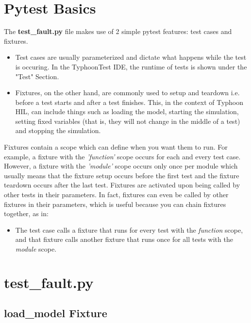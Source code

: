 \documentclass{article}
\begin{document}
\section{Pytest Basics}

The \textbf{test\_fault.py} file makes use of 2 simple pytest features: test cases and fixtures. 

\begin{itemize}

    \item Test cases are usually parameterized and dictate what happens while the test is occuring. In the TyphoonTest IDE, the runtime of tests is shown under the "Test" Section.
    
    \item  Fixtures, on the other hand, are commonly used to setup and teardown i.e. before a test starts and after a test finishes. This, in the context of Typhoon HIL, can include things such as loading the model, starting the simulation, setting fixed variables (that is, they will not change in the middle of a test) and stopping the simulation.
    
\end{itemize}

Fixtures contain a scope which can define when you want them to run. For example, a fixture with the \textit{'function'} scope occurs for each and every test case. However, a fixture with the \textit{'module'} scope occurs only once per module which usually means that the fixture setup occurs before the first test and the fixture teardown occurs after the last test. Fixtures are activated upon being called by other tests in their parameters. In fact, fixtures can even be called by other fixtures in their parameters, which is useful because you can chain fixtures together, as in: 

\begin{itemize}

    \item The test case calls a fixture that runs for every test with the \textit{function} scope, and that fixture calls another fixture that runs once for all tests with the \textit{module} scope.
    
\end{itemize}

\section{test\_fault.py}

\subsection{load\_model Fixture}
\end{document}
